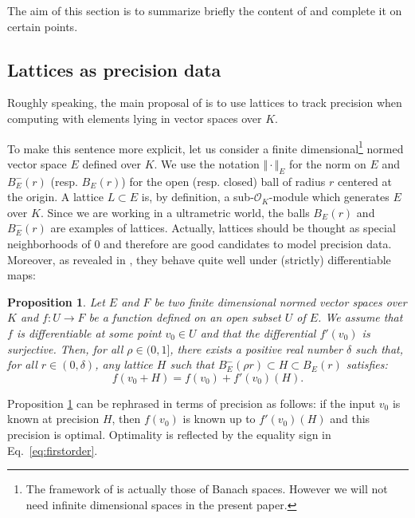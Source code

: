 \documentclass{sig-alternate}
\newtheorem{prop}[theo]{Proposition}
\renewcommand{\O}{\mathcal O}
\begin{document}
The aim of this section is to summarize briefly the content of 
\cite{caruso-roe-vaccon:14a} and complete it on certain points.

\subsection{Lattices as precision data}

Roughly speaking, the main proposal of \cite{caruso-roe-vaccon:14a} is 
to use lattices to track precision when computing with elements lying in 
vector spaces over $K$.

To make this sentence more explicit, let us consider a finite 
dimensional\footnote{The framework of \cite{caruso-roe-vaccon:14a} is 
actually those of Banach spaces. However we will not need infinite 
dimensional spaces in the present paper.} normed vector space $E$ 
defined over $K$. We use the notation $\Vert \cdot \Vert_E$ for the norm 
on $E$ and $B^-_E(r)$ (resp. $B^{\phantom -}_E(r)$) for the open (resp. 
closed) ball of radius $r$ centered at the origin. A lattice $L \subset 
E$ is, by definition, a sub-$\O_K$-module which generates $E$ over $K$. 
Since we are working in a ultrametric world, the balls $B^{\phantom 
-}_E(r)$ and $B^-_E(r)$ are examples of lattices. Actually, lattices 
should be thought as special neighborhoods of $0$ and therefore are good 
candidates to model precision data. Moreover, as revealed in 
\cite{caruso-roe-vaccon:14a}, they behave quite well under (strictly) 
differentiable maps:

\begin{prop}
\label{prop:precision}
Let $E$ and $F$ be two finite dimensional normed vector spaces over $K$ 
and $f : U \rightarrow F$ be a function defined on an open subset $U$ of 
$E$. We assume that $f$ is differentiable at some point $v_0 \in U$ and 
that the differential $f'(v_0)$ is surjective.
Then, for all $\rho \in (0, 1]$, there exists a positive real
number $\delta$ such that, for all $r \in (0, \delta)$, any lattice
$H$ such that $B^-_E(\rho r) \subset H \subset B^{\phantom -}_E(r)$ 
satisfies:
\begin{equation}
\label{eq:firstorder}
f(v_0 + H) = f(v_0) + f'(v_0) (H).
\end{equation}
\end{prop}

Proposition \ref{prop:precision} can be rephrased in terms of precision 
as follows: if the input $v_0$ is known at precision $H$, then $f(v_0)$ 
is known up to $f'(v_0)(H)$ and this precision is optimal. Optimality is 
reflected by the equality sign in Eq.~\eqref{eq:firstorder}.
\end{document}
